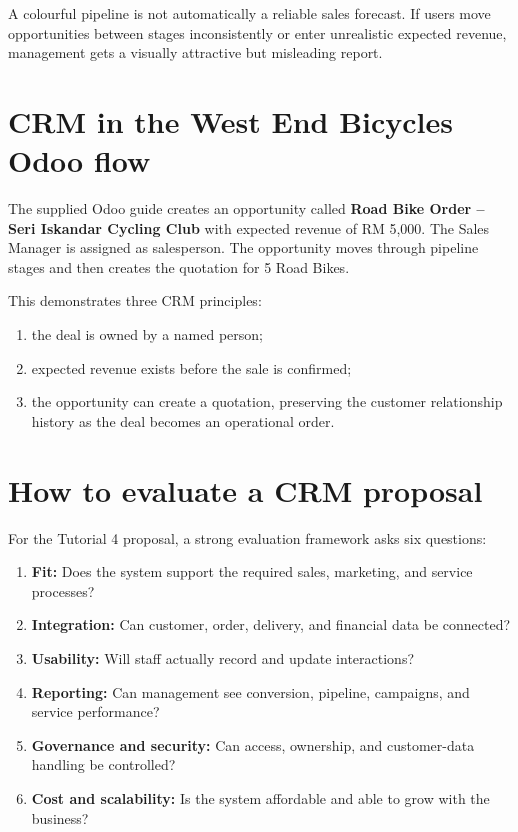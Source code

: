 \begin{pitfall}
A colourful pipeline is not automatically a reliable sales forecast. If users move opportunities between stages inconsistently or enter unrealistic expected revenue, management gets a visually attractive but misleading report.
\end{pitfall}

\section{CRM in the West End Bicycles Odoo flow}

\begin{odoobox}
The supplied Odoo guide creates an opportunity called \textbf{Road Bike Order -- Seri Iskandar Cycling Club} with expected revenue of RM 5,000. The Sales Manager is assigned as salesperson. The opportunity moves through pipeline stages and then creates the quotation for 5 Road Bikes.

This demonstrates three CRM principles:
\begin{enumerate}
  \item the deal is owned by a named person;
  \item expected revenue exists before the sale is confirmed;
  \item the opportunity can create a quotation, preserving the customer relationship history as the deal becomes an operational order.
\end{enumerate}
\end{odoobox}

\section{How to evaluate a CRM proposal}

For the Tutorial 4 proposal, a strong evaluation framework asks six questions:

\begin{enumerate}
  \item \textbf{Fit:} Does the system support the required sales, marketing, and service processes?
  \item \textbf{Integration:} Can customer, order, delivery, and financial data be connected?
  \item \textbf{Usability:} Will staff actually record and update interactions?
  \item \textbf{Reporting:} Can management see conversion, pipeline, campaigns, and service performance?
  \item \textbf{Governance and security:} Can access, ownership, and customer-data handling be controlled?
  \item \textbf{Cost and scalability:} Is the system affordable and able to grow with the business?
\end{enumerate}

